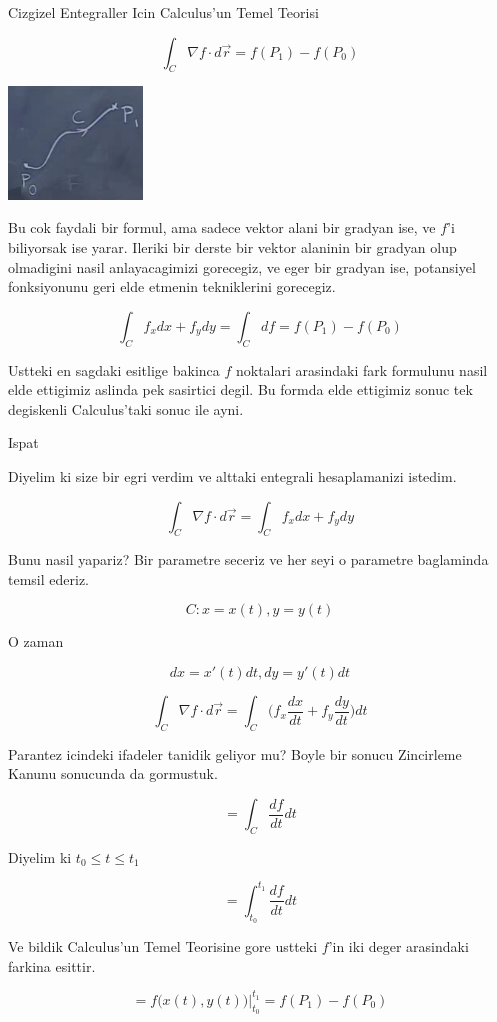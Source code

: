 \documentclass[12pt,fleqn]{article}
\begin{document}
Cizgizel Entegraller Icin Calculus'un Temel Teorisi

\[ \int_{C} \nabla f \cdot d\vec{r} = 
f(P_1) - f(P_0)
 \]

\includegraphics[height=3cm]{20_5.png}

Bu cok faydali bir formul, ama sadece vektor alani bir gradyan ise, ve
$f$'i biliyorsak ise yarar. Ileriki bir derste bir vektor alaninin bir
gradyan olup olmadigini nasil anlayacagimizi gorecegiz, ve eger bir gradyan
ise, potansiyel fonksiyonunu geri elde etmenin tekniklerini gorecegiz. 

\[ \int_C f_x dx + f_y dy  = \int_C df = f(P_1) - f(P_0) \]


Ustteki en sagdaki esitlige bakinca $f$ noktalari arasindaki fark formulunu
nasil elde ettigimiz aslinda pek sasirtici degil. Bu formda elde ettigimiz
sonuc tek degiskenli Calculus'taki sonuc ile ayni. 

Ispat

Diyelim ki size bir egri verdim ve alttaki entegrali hesaplamanizi
istedim. 

\[ \int_{C} \nabla f \cdot d\vec{r} =  \int_C f_x dx + f_y dy
 \]

Bunu nasil yapariz? Bir parametre seceriz ve her seyi o parametre
baglaminda temsil ederiz. 

\[ C: x = x(t), y = y(t) \]

O zaman 

\[ dx = x'(t)dt, dy = y'(t)dt \]

\[ \int_{C} \nabla f \cdot d\vec{r} =  
\int_C \bigg( f_x \frac{dx}{dt} + f_y \frac{dy}{dt} \bigg) dt
\]

Parantez icindeki ifadeler tanidik geliyor mu? Boyle bir sonucu Zincirleme
Kanunu sonucunda da gormustuk. 

\[ = \int_C \frac{df}{dt} dt\]

Diyelim ki $t_0 \le t \le t_1$

\[ = \int_{t_0}^{t_1} \frac{df}{dt} dt\]

Ve bildik Calculus'un Temel Teorisine gore ustteki $f$'in iki deger
arasindaki farkina esittir. 

\[ = f\bigg( x(t), y(t) \bigg) \bigg|_{t_0}^{t_1} =
f(P_1) - f(P_0)
\]
\end{document}
